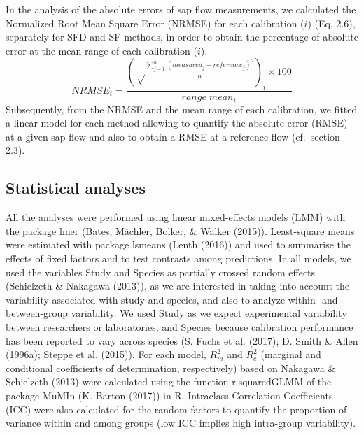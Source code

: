 \documentclass[11pt,twoside]{reedthesis}
\begin{document}
In the analysis of the absolute errors of sap flow measurements, we
calculated the Normalized Root Mean Square Error (NRMSE) for each
calibration (\(i\)) (Eq. 2.6), separately for SFD and SF methods, in
order to obtain the percentage of absolute error at the mean range of
each calibration (\(i\)).
\begin{equation}
NRMSE_i = \frac{(\sqrt \frac{\sum_{j=1}^{n} (measured_j-reference_j)^2}{n})_i\times 100}{range\;mean_i}
\end{equation}
Subsequently, from the NRMSE and the mean range of each calibration, we
fitted a linear model for each method allowing to quantify the absolute
error (RMSE) at a given sap flow and also to obtain a RMSE at a
reference flow (cf.~section 2.3).\par

\subsection{Statistical analyses}\label{statistical-analyses}

All the analyses were performed using linear mixed-effects models (LMM)
with the package lmer (Bates, Mächler, Bolker, \& Walker (2015)).
Least-square means were estimated with package lsmeans (Lenth (2016))
and used to summarise the effects of fixed factors and to test contrasts
among predictions. In all models, we used the variables Study and
Species as partially crossed random effects (Schielzeth \& Nakagawa
(2013)), as we are interested in taking into account the variability
associated with study and species, and also to analyze within- and
between-group variability. We used Study as we expect experimental
variability between researchers or laboratories, and Species because
calibration performance has been reported to vary across species (S.
Fuchs et al. (2017); D. Smith \& Allen (1996a); Steppe et al. (2015)).
For each model, \(R^2_m\) and \(R^2_c\) (marginal and conditional
coefficients of determination, respectively) based on Nakagawa \&
Schielzeth (2013) were calculated using the function r.squaredGLMM of
the package MuMIn (K. Barton (2017)) in R. Intraclass Correlation
Coefficients (ICC) were also calculated for the random factors to
quantify the proportion of variance within and among groups (low ICC
implies high intra-group variability).\par
\end{document}
